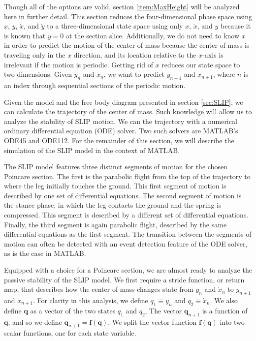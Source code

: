 Though all of the options are valid, section \ref{item:MaxHeight} will be
analyzed here in further detail. This section reduces the four-dimensional
phase space using $x$, $y$, $\dot{x}$, and $\dot{y}$ to a three-dimensional
state space using only $x$, $\dot{x}$, and $y$ because it is known that
$\dot{y} = 0$ at the section slice. Additionally, we do not need to know $x$ in
order to predict the motion of the center of mass because the center of mass is
traveling only in the $x$ direction, and its location relative to the $x$-axis
is irrelevant if the motion is periodic. Getting rid of $x$ reduces our state
space to two dimensions. Given $y_{n}$ and $\dot{x}_{n}$, we want to predict
$y_{n+1}$ and $x_{n+1}$, where $n$ is an index through sequential
sections of the periodic motion.

Given the model and the free body diagram presented in section \ref{sec:SLIP},
we can calculate the trajectory of the center of mass. Such knowledge will
allow us to analyze the stability of SLIP motion. We can the trajectory with a
numerical ordinary differential equation (ODE) solver. Two such solvers are
MATLAB's ODE45 and ODE112. For the remainder of this section, we will describe
the simulation of the SLIP model in the context of MATLAB.

The SLIP model features three distinct segments of motion for the chosen
Poincare section. The first is the parabolic flight from the top of the
trajectory to where the leg initially touches the ground. This first segment of
motion is described by one set of differential equations. The second segment of
motion is the stance phase, in which the leg contacts the ground and the spring
is compressed. This segment is described by a different set of differential
equations. Finally, the third segment is again parabolic flight, described by
the same differential equations as the first segment. The transition between
the segments of motion can often be detected with an event detection feature of
the ODE solver, as is the case in MATLAB.

Equipped with a choice for a Poincare section, we are almost ready to analyze
the passive stability of the SLIP model. We first require a stride function, or
return map, that describes how the center of mass changes state from $y_{n}$
and $\dot{x}_{n}$ to $y_{n+1}$ and $\dot{x}_{n+1}$.  For clarity in this
analysis, we define $q_{1}\equiv y_{n}$ and $q_{2}\equiv\dot{x}_{n}$. We also
define $\mathbf{q}$ as a vector of the two states $q_{1}$ and $q_{2}$, The
vector $\mathbf{q}_{n+1}$ is a function of $\mathbf{q}$, and so we define
$\mathbf{q}_{n+1} = \mathbf{f}(\mathbf{q})$.  We split the vector function
$\mathbf{f}(\mathbf{q})$ into two scalar functions, one for each state variable.

